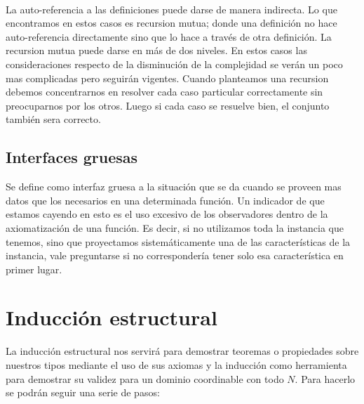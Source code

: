 ~

La auto-referencia a las definiciones puede darse de manera indirecta. Lo que encontramos en estos casos es recursion mutua; donde una definici\'on no hace auto-referencia directamente sino que lo hace a trav\'es de otra definici\'on. La recursion mutua puede darse en m\'as de dos niveles. En estos casos las consideraciones respecto de la disminuci\'on de la complejidad se ver\'an un poco mas complicadas pero seguir\'an vigentes. Cuando planteamos una recursion debemos concentrarnos en resolver cada caso particular correctamente sin preocuparnos por los otros. Luego si cada caso se resuelve bien, el conjunto tambi\'en sera correcto.

\subsection{Interfaces gruesas}

Se define como interfaz gruesa a la situaci\'on que se da cuando se proveen mas datos que los necesarios en una determinada funci\'on. Un indicador de que estamos cayendo en esto es el uso excesivo de los observadores dentro de la axiomatizaci\'on de una funci\'on. Es decir, si no utilizamos toda la instancia que tenemos, sino que proyectamos sistem\'aticamente una de las caracter\'isticas de la instancia, vale preguntarse si no corresponder\'ia tener solo esa caracter\'istica en primer lugar.

\newpage
\section{Inducci\'on estructural}

La inducci\'on estructural nos servir\'a para demostrar teoremas o propiedades sobre nuestros tipos mediante el uso de sus axiomas y la inducci\'on como herramienta para demostrar su validez para un dominio coordinable con todo $N$. Para hacerlo se podr\'an seguir una serie de pasos:

